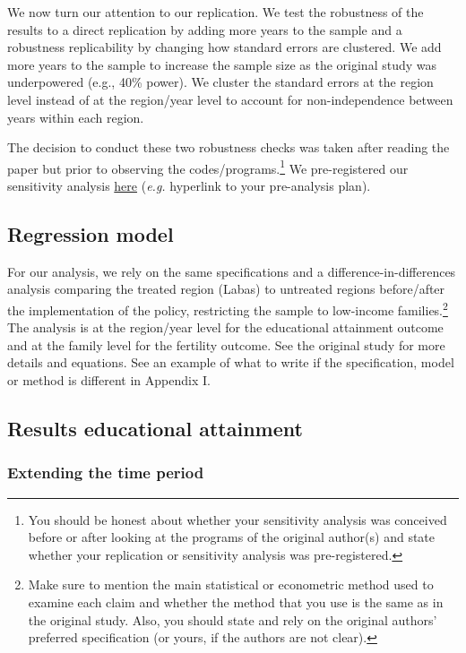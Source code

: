 \documentclass[12pt,a4paper]{article}
\begin{document}
\begin{spacing}{1.5}
We now turn our attention to our replication. We test the robustness of the results to a direct replication by adding more years to the sample and a robustness replicability by changing how standard errors are clustered. We add more years to the sample to increase the sample size as the original study was underpowered (e.g., 40\% power). We cluster the standard errors at the region level instead of at the region/year level to account for non-independence between years within each region.

The decision to conduct these two robustness checks was taken after reading the paper but prior to observing the codes/programs.\footnote{You should be honest about whether your sensitivity analysis was conceived before or after looking at the programs of the original author(s) and state whether your replication or sensitivity analysis was pre-registered.} We pre-registered our sensitivity analysis \href{https://youtu.be/dQw4w9WgXcQ?si=0Yf0yZeha80GyZll}{here} (\textit{e.g.} hyperlink to your pre-analysis plan).

\subsection{Regression model}

For our analysis, we rely on the same specifications and a difference-in-differences analysis comparing the treated region (Labas) to untreated regions before/after the implementation of the policy, restricting the sample to low-income families.\footnote{Make sure to mention the main statistical or econometric method used to examine each claim and whether the method that you use is the same as in the original study. Also, you should state and rely on the original authors’ preferred specification (or yours, if the authors are not clear).} The analysis is at the region/year level for the educational attainment outcome and at the family level for the fertility outcome. See the original study for more details and equations. See an example of what to write if the specification, model or method is different in Appendix I.


\subsection{Results educational attainment}

\subsubsection{Extending the time period}


\end{spacing}
\end{document}
